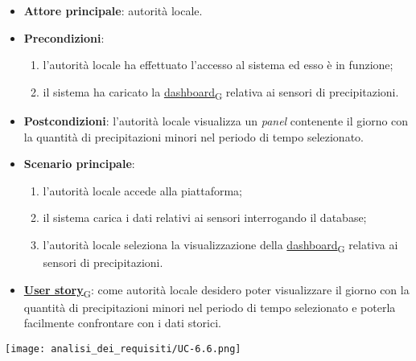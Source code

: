 \begin{itemize}
	\item \textbf{Attore principale}: autorità locale.
	\item \textbf{Precondizioni}:
	      \begin{enumerate}
		      \item l'autorità locale ha effettuato l'accesso al sistema ed esso è in funzione;
		      \item il sistema ha caricato la \href{https://7last.github.io/docs/rtb/documentazione-interna/glossario\#dashboard}{dashboard\textsubscript{G}} relativa ai sensori di precipitazioni.
	      \end{enumerate}
	\item \textbf{Postcondizioni}: l'autorità locale visualizza un \textit{panel} contenente il giorno con la quantità di precipitazioni minori nel periodo di tempo selezionato.
	\item \textbf{Scenario principale}:
	      \begin{enumerate}
		      \item l'autorità locale accede alla piattaforma;
		      \item il sistema carica i dati relativi ai sensori interrogando il database;
		      \item l'autorità locale seleziona la visualizzazione della \href{https://7last.github.io/docs/rtb/documentazione-interna/glossario\#dashboard}{dashboard\textsubscript{G}} relativa ai sensori di precipitazioni.
	      \end{enumerate}
	\item \href{https://7last.github.io/docs/rtb/documentazione-interna/glossario\#user-story}{\textbf{User story}\textsubscript{G}}:
	      come autorità locale desidero poter visualizzare il giorno con la quantità di precipitazioni minori nel periodo di tempo selezionato
	      e poterla facilmente confrontare con i dati storici.
\end{itemize}
\begin{center}
	\texttt{[image: analisi\_dei\_requisiti/UC-6.6.png]}
\end{center}

